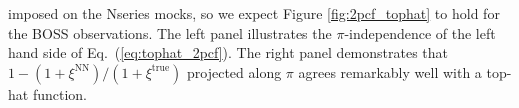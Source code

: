                                                                                                                                                                                                                                                                          imposed on the Nseries mocks, so we expect Figure \ref{fig:2pcf_tophat} 
                                                                                                                                                                                                                                                                          to hold for the BOSS observations. The left panel illustrates 
                                                                                                                                                                                                                                                                          the $\pi$-independence of the left hand side of Eq.~(\ref{eq:tophat_2pcf}). 
                                                                                                                                                                                                                                                                          The right panel demonstrates that 
                                                                                                                                                                                                                                                                          $1- (1+{\xi^\mathrm{NN}})/(1 + {\xi^\mathrm{true}})$ projected
                                                                                                                                                                                                                                                                          along $\pi$ agrees remarkably well with a top-hat function. 

